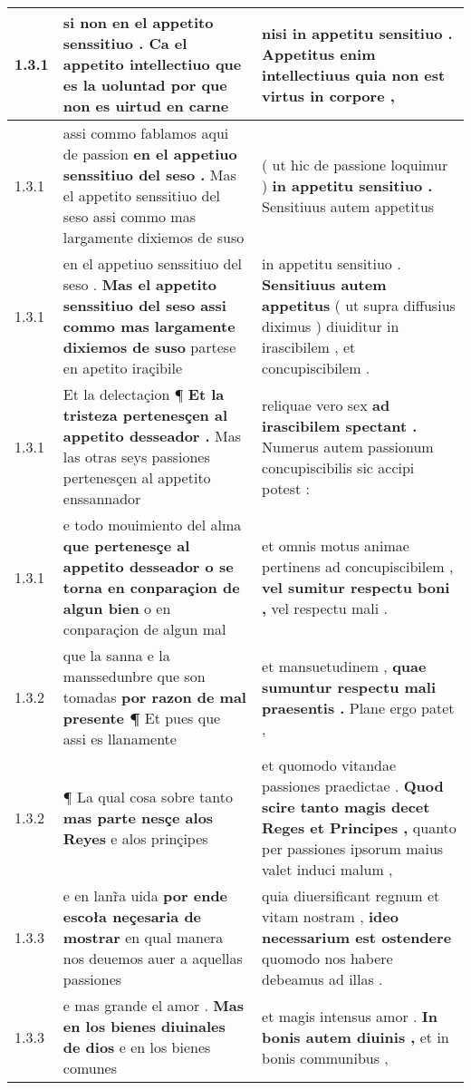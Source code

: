 \begin{tabular}{|p{1cm}|p{6.5cm}|p{6.5cm}|}
1.3.1 & si non en el appetito senssitiuo . \textbf{ Ca el appetito intellectiuo que es la uoluntad } por que non es uirtud en carne & nisi in appetitu sensitiuo . \textbf{ Appetitus enim intellectiuus } quia non est virtus in corpore , \\\hline
1.3.1 & assi commo fablamos aqui de passion \textbf{ en el appetiuo senssitiuo del seso . } Mas el appetito senssitiuo del seso assi commo mas largamente dixiemos de suso & ( ut hic de passione loquimur ) \textbf{ in appetitu sensitiuo . } Sensitiuus autem appetitus \\\hline
1.3.1 & en el appetiuo senssitiuo del seso . \textbf{ Mas el appetito senssitiuo del seso assi commo mas largamente dixiemos de suso } partese en apetito iraçibile & in appetitu sensitiuo . \textbf{ Sensitiuus autem appetitus } ( ut supra diffusius diximus ) diuiditur in irascibilem , et concupiscibilem . \\\hline
1.3.1 & Et la delectaçion ¶ \textbf{ Et la tristeza pertenesçen al appetito desseador . } Mas las otras seys passiones pertenesçen al appetito enssannador & reliquae vero sex \textbf{ ad irascibilem spectant . } Numerus autem passionum concupiscibilis sic accipi potest : \\\hline
1.3.1 & e todo mouimiento del alma \textbf{ que pertenesçe al appetito desseador o se torna en conparaçion de algun bien } o en conparaçion de algun mal & et omnis motus animae pertinens ad concupiscibilem , \textbf{ vel sumitur respectu boni , } vel respectu mali . \\\hline
1.3.2 & que la sanna e la manssedunbre que son tomadas \textbf{ por razon de mal presente ¶ } Et pues que assi es llanamente & et mansuetudinem , \textbf{ quae sumuntur respectu mali praesentis . } Plane ergo patet , \\\hline
1.3.2 & ¶ La qual cosa sobre tanto \textbf{ mas parte nesçe alos Reyes } e alos prinçipes & et quomodo vitandae passiones praedictae . \textbf{ Quod scire tanto magis decet Reges et Principes , } quanto per passiones ipsorum maius valet induci malum , \\\hline
1.3.3 & e en lanr̃a uida \textbf{ por ende escoła neçesaria de mostrar } en qual manera nos deuemos auer a aquellas passiones & quia diuersificant regnum et vitam nostram , \textbf{ ideo necessarium est ostendere } quomodo nos habere debeamus ad illas . \\\hline
1.3.3 & e mas grande el amor . \textbf{ Mas en los bienes diuinales de dios } e en los bienes comunes & et magis intensus amor . \textbf{ In bonis autem diuinis , } et in bonis communibus , \\\hline

\end{tabular}
